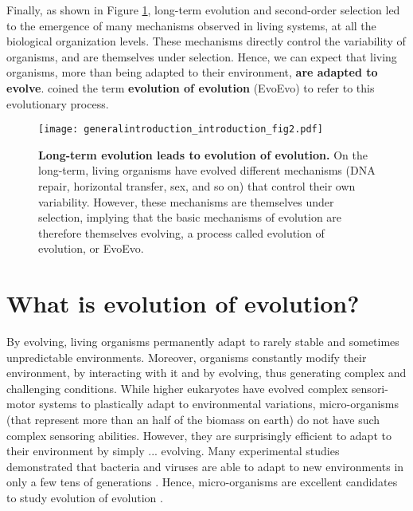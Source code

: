 Finally, as shown in Figure \ref{fig:general_introduction:introduction:fig2}, long-term evolution and second-order selection led to the emergence of many mechanisms observed in living systems, at all the biological organization levels. These mechanisms directly control the variability of organisms, and are themselves under selection. Hence, we can expect that living organisms, more than being adapted to their environment, \textbf{are adapted to evolve}. \cite{hindre-et-al-2012} coined the term \textbf{evolution of evolution} (EvoEvo) to refer to this evolutionary process.

\begin{figure}[!h]
\centering
\texttt{[image: generalintroduction\_introduction\_fig2.pdf]}
\caption[Long-term evolution leads to evolution of evolution.]{{\bf Long-term evolution leads to evolution of evolution.} On the long-term, living organisms have evolved different mechanisms (DNA repair, horizontal transfer, sex, and so on) that control their own variability. However, these mechanisms are themselves under selection, implying that the basic mechanisms of evolution are therefore themselves evolving, a process called evolution of evolution, or EvoEvo.}
\label{fig:general_introduction:introduction:fig2}
\end{figure}


\section{What is evolution of evolution?}
\label{sec:general_introduction:introduction:what_is_evoevo}

By evolving, living organisms permanently adapt to rarely stable and sometimes unpredictable environments. Moreover, organisms constantly modify their environment, by interacting with it and by evolving, thus generating complex and challenging conditions. While higher eukaryotes have evolved complex sensori-motor systems to plastically adapt to environmental variations, micro-organisms (that represent more than an half of the biomass on earth) do not have such complex sensoring abilities. However, they are surprisingly efficient to adapt to their environment by simply ... evolving. Many experimental studies demonstrated that bacteria and viruses are able to adapt to new environments in only a few tens of generations \citep{rainey-travisano-1998,zhang-et-al-2011}. Hence, micro-organisms are excellent candidates to study evolution of evolution \citep{hindre-et-al-2012}.

